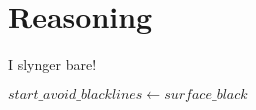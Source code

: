 \section{Reasoning} \label{sec:reasoning}

I slynger bare!



\hspace{3mm} $start\_avoid\_blacklines \leftarrow surface\_black$